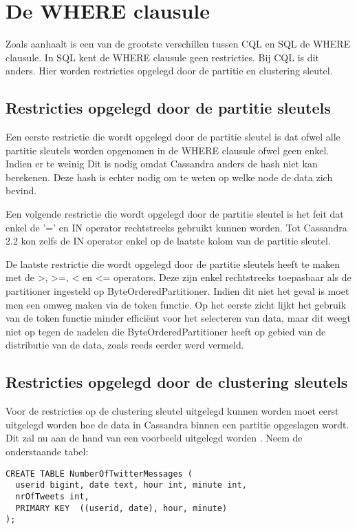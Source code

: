 \section{De WHERE clausule}
Zoals \cite{Lerer2015Where} aanhaalt is een van de grootste verschillen tussen CQL en SQL de WHERE clausule.
In SQL kent de WHERE clausule geen restricties.
Bij CQL is dit anders.
Hier worden restricties opgelegd door de partitie en clustering sleutel.

\subsection{Restricties opgelegd door de partitie sleutels}

Een eerste restrictie die wordt opgelegd door de partitie sleutel is dat ofwel alle partitie sleutels worden opgenomen in de WHERE clausule ofwel geen enkel.
Indien er te weinig 
Dit is nodig omdat Cassandra anders de hash niet kan berekenen.
Deze hash is echter nodig om te weten op welke node de data zich bevind.

Een volgende restrictie die wordt opgelegd door de partitie sleutel is het feit dat enkel de '=' en IN operator rechtstreeks gebruikt kunnen worden.
Tot Cassandra 2.2 kon zelfs de IN operator enkel op de laatste kolom van de partitie sleutel.

De laatste restrictie die wordt opgelegd door de partitie sleutels heeft te maken met de >, >=, < en <= operators.
Deze zijn enkel rechtstreeks toepasbaar als de partitioner ingesteld op ByteOrderedPartitioner.
Indien dit niet het geval is moet men een omweg maken via de token functie.
Op het eerste zicht lijkt het gebruik van de token functie minder efficiënt voor het selecteren van data, maar dit weegt niet op tegen de nadelen die ByteOrderedPartitioner heeft op gebied van de distributie van de data, zoals reeds eerder werd vermeld.

\subsection{Restricties opgelegd door de clustering sleutels}
Voor de restricties op de clustering sleutel uitgelegd kunnen worden moet eerst uitgelegd worden hoe de data in Cassandra binnen een partitie opgeslagen wordt.
Dit zal nu aan de hand van een voorbeeld uitgelegd worden \citep{Lerer2015Where}.
Neem de onderstaande tabel:

\begin{lstlisting}
CREATE TABLE NumberOfTwitterMessages (
  userid bigint, date text, hour int, minute int,
  nrOfTweets int,
  PRIMARY KEY  ((userid, date), hour, minute)
);
\end{lstlisting}

